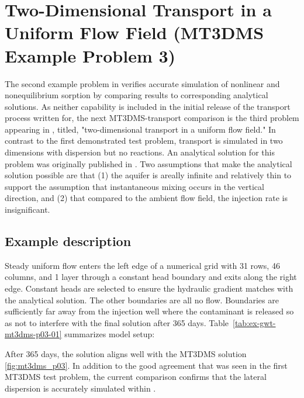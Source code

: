 \section{Two-Dimensional Transport in a Uniform Flow Field (MT3DMS Example Problem 3)}

The second example problem in \cite{zheng1999mt3dms} verifies accurate simulation of nonlinear and nonequilibrium sorption by comparing results to corresponding analytical solutions. As neither capability is included in the initial release of the transport process written for\mf, the next MT3DMS-\mf transport comparison is the third problem appearing in \cite{zheng1999mt3dms}, titled, "two-dimensional transport in a uniform flow field." In contrast to the first demonstrated test problem, transport is simulated in two dimensions with dispersion but no reactions. An analytical solution for this problem was originally published in \cite{wilson1978}. Two assumptions that make the analytical solution possible are that (1) the aquifer is areally infinite and relatively thin to support the assumption that instantaneous mixing occurs in the vertical direction, and (2) that compared to the ambient flow field, the injection rate is insignificant.  

\subsection{Example description}

Steady uniform flow enters the left edge of a numerical grid with 31 rows, 46 columns, and 1 layer through a constant head boundary and exits along the right edge. Constant heads are selected to ensure the hydraulic gradient matches with the analytical solution. The other boundaries are all no flow. Boundaries are sufficiently far away from the injection well where the contaminant is released so as not to interfere with the final solution after 365 days. Table~\ref{tab:ex-gwt-mt3dms-p03-01} summarizes model setup:



After 365 days, the \mf solution aligns well with the MT3DMS solution \ref{fig:mt3dms_p03}. In addition to the good agreement that was seen in the first  MT3DMS test problem, the current comparison confirms that the lateral dispersion is accurately simulated within \mf.


